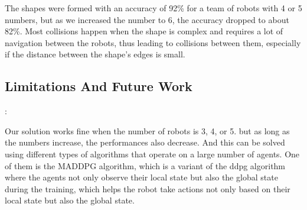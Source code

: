 \documentclass[12pt]{extarticle}
\begin{document}
The shapes were formed with an accuracy of 92\% for a team of robots with 4 or 5 numbers, but as we increased the number to 6, the accuracy dropped to about 82\%.
Most collisions happen when the shape is complex and requires a lot of navigation between the robots, thus leading to collisions between them, especially if the distance between the shape's edges is small.

 

\subsection{Limitations And Future Work}:

Our solution works fine when the number of robots is 3, 4, or 5. but as long as the numbers increase, the performances also decrease. And this can be solved using different types of algorithms that operate on a large number of agents. One of them is the MADDPG algorithm, which is a variant of the ddpg algorithm where the agents not only observe their local state but also the global state during the training, which helps the robot take actions not only based on their local state but also the global state.
\end{document}
